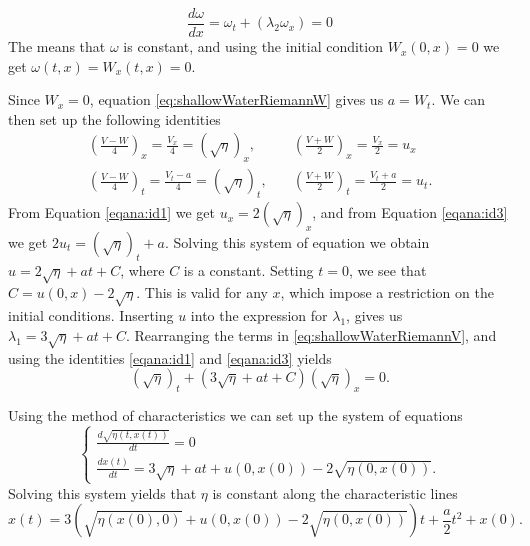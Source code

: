 \documentclass[11pt]{article}
\begin{document}
\begin{equation}
	\frac{d \omega}{d x} = \omega_t + \left( \lambda_2 \omega_x \right) = 0
\end{equation}
The means that $\omega$ is constant, and using the initial condition $W_x(0,x) = 0$ we get $\omega(t,x) = W_x(t,x) = 0$.


Since $W_x = 0$, equation \eqref{eq:shallowWaterRiemannW} gives us $a = W_t$. We can then set up  the following identities
\begin{align}
\left(\frac{V-W}{4}\right)_x = \frac{V_x}{4} = \left( \sqrt{\eta}\right)_x,& \quad
\left(\frac{V+W}{2}\right)_x = \frac{V_x}{2} = u_x \label{eqana:id1}\\ 
\left(\frac{V-W}{4}\right)_t = \frac{V_t - a}{4} = \left( \sqrt{\eta}\right)_t,  &\quad \left(\frac{V+W}{2}\right)_t = \frac{V_t + a}{2} = u_t.
\label{eqana:id3}
\end{align}
From Equation \eqref{eqana:id1} we get $u_x = 2\left( \sqrt{\eta}\right)_x$, and from Equation \eqref{eqana:id3} we get $2u_t  =\left( \sqrt{\eta}\right)_t + a$. Solving this system of equation we obtain $u = 2\sqrt{\eta}+at+ C$, where $C$ is a constant. Setting $t=0$, we see that $C = u(0,x)-2\sqrt{\eta}$. This is valid for any $x$, which impose a restriction on the initial conditions. Inserting $u$ into the expression for $\lambda_1$, gives us $\lambda_1 = 3 \sqrt{\eta} + at+C$. Rearranging the terms in \eqref{eq:shallowWaterRiemannV}, and using the identities \eqref{eqana:id1} and \eqref{eqana:id3} yields
\begin{equation}
	\left(\sqrt{\eta}\right)_t + \left( 3 \sqrt{\eta} + at + C \right) \left(\sqrt{\eta}\right)_x = 0.
\end{equation}



Using the method of characteristics we can set up the system of equations 
\begin{equation*}
\label{blablabla}
\begin{cases}
\frac{d \sqrt{\eta(t,x(t))}}{dt} = 0\\
\frac{d x(t)}{d t} = 3 \sqrt{\eta} + at + u(0,x(0)) - 2\sqrt{\eta (0,x(0))} .
\end{cases}
\end{equation*}
Solving this system yields that $\eta$ is constant along the characteristic lines
\begin{equation}
	x(t) = 3 \left(\sqrt{\eta\left(x(0),0\right)}+ u(0,x(0)) - 2\sqrt{\eta (0,x(0))} \right)t + \frac{a}{2}t^2 + x(0).
\end{equation}
\end{document}
